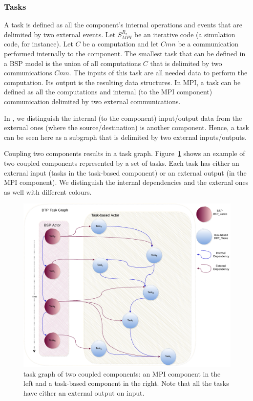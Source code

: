 \subsubsection{\deisa Tasks}\label{sec:btp:task}

A task is defined as all the component's internal operations and events that are delimited by two external events. 
Let $S_{MPI}^{R_{s}}$ be an iterative code (a simulation code, for instance). Let $C$ be a computation and let $Cmn$ be a communication performed internally to the component. The smallest task that can be defined in a BSP model is the union of all computations $C$ that is delimited by two communications $Cmn$. The inputs of this task are all needed data to perform the computation. Its output is the resulting data structures. 
In MPI, a task can be defined as all the computations and internal (to the MPI component) communication delimited by two external communications.

In \dask, we distinguish the internal (to the component) input/output data from the external ones (where the source/destination) is another component. Hence, a \deisa task can be seen here as a \dask subgraph that is delimited by two external inputs/outputs.

Coupling two components results in a task graph. Figure~\ref{figWUG} shows an example of two coupled components represented by a set of tasks. Each task has either an external input (tasks in the task-based component) or an external output (in the MPI component). We distinguish the internal dependencies and the external ones as well with different colours.

\begin{figure}[tb]\centering
\includegraphics[width=0.75\columnwidth]{figures/BTPTaskGraph.pdf}
\caption{\deisa task graph of two coupled components: an MPI component in the left and a task-based component in the right. Note that all the tasks have either an external output on input.}
\label{figWUG}
\end{figure}


